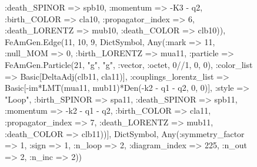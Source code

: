 \documentclass{revtex4}
\begin{document}
\begin{figure}[!htb]
\begin{center}
{:death_SPINOR => spb10, :momentum => -K3 - q2, :birth_COLOR => cla10, :propagator_index => 6, :death_LORENTZ => mub10, :death_COLOR => clb10)), FeAmGen.Edge(11, 10, 9, Dict{Symbol, Any}(:mark => 11, :null_MOM => 0, :birth_LORENTZ => mua11, :particle => FeAmGen.Particle(21, "g", "g", :vector, :octet, 0//1, 0, 0), :color_list => Basic[DeltaAdj(clb11, cla11)], :couplings_lorentz_list => Basic[-im*LMT(mua11, mub11)*Den(-k2 - q1 - q2, 0, 0)], :style => "Loop", :birth_SPINOR => spa11, :death_SPINOR => spb11, :momentum => -k2 - q1 - q2, :birth_COLOR => cla11, :propagator_index => 7, :death_LORENTZ => mub11, :death_COLOR => clb11))], Dict{Symbol, Any}(:symmetry_factor => 1, :sign => 1, :n_loop => 2, :diagram_index => 225, :n_out => 2, :n_inc => 2)) 
}
\end{center}
\end{figure}
\end{document}

